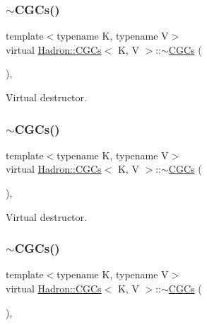\subsubsection{\texorpdfstring{$\sim$CGCs()}{~CGCs()}\hspace{0.1cm}{\footnotesize\ttfamily [1/3]}}
{\footnotesize\ttfamily template$<$typename K, typename V$>$ \\
virtual \mbox{\hyperlink{classHadron_1_1CGCs}{Hadron\+::\+C\+G\+Cs}}$<$ K, V $>$\+::$\sim$\mbox{\hyperlink{classHadron_1_1CGCs}{C\+G\+Cs}} (\begin{DoxyParamCaption}{ }\end{DoxyParamCaption})\hspace{0.3cm}{\ttfamily [inline]}, {\ttfamily [virtual]}}



Virtual destructor. 

\mbox{\label{classHadron_1_1CGCs_a882c1ea3451254725b9d86c598d6c29a}} 
\subsubsection{\texorpdfstring{$\sim$CGCs()}{~CGCs()}\hspace{0.1cm}{\footnotesize\ttfamily [2/3]}}
{\footnotesize\ttfamily template$<$typename K, typename V$>$ \\
virtual \mbox{\hyperlink{classHadron_1_1CGCs}{Hadron\+::\+C\+G\+Cs}}$<$ K, V $>$\+::$\sim$\mbox{\hyperlink{classHadron_1_1CGCs}{C\+G\+Cs}} (\begin{DoxyParamCaption}{ }\end{DoxyParamCaption})\hspace{0.3cm}{\ttfamily [inline]}, {\ttfamily [virtual]}}



Virtual destructor. 

\mbox{\label{classHadron_1_1CGCs_a882c1ea3451254725b9d86c598d6c29a}} 
\subsubsection{\texorpdfstring{$\sim$CGCs()}{~CGCs()}\hspace{0.1cm}{\footnotesize\ttfamily [3/3]}}
{\footnotesize\ttfamily template$<$typename K, typename V$>$ \\
virtual \mbox{\hyperlink{classHadron_1_1CGCs}{Hadron\+::\+C\+G\+Cs}}$<$ K, V $>$\+::$\sim$\mbox{\hyperlink{classHadron_1_1CGCs}{C\+G\+Cs}} (\begin{DoxyParamCaption}{ }\end{DoxyParamCaption})\hspace{0.3cm}{\ttfamily [inline]}, {\ttfamily [virtual]}}



